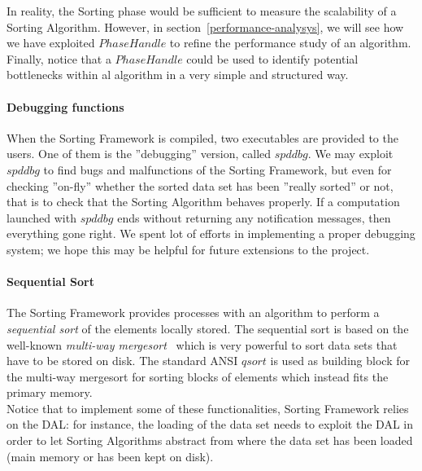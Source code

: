 In reality, the Sorting phase would be sufficient to measure the scalability of a Sorting Algorithm. However, in section~\ref{performance-analysys}, we will see how we have exploited $PhaseHandle$ to refine the performance study of an algorithm. Finally, notice that a $PhaseHandle$ could be used to identify potential bottlenecks within al algorithm in a very simple and structured way.

\paragraph{Debugging functions} When the Sorting Framework is compiled, two executables are provided to the users. One of them is the ''debugging'' version, called $spddbg$. We may exploit $spddbg$ to find bugs and malfunctions of the Sorting Framework, but even for checking ''on-fly'' whether the sorted data set has been ''really sorted'' or not, that is to check that the Sorting Algorithm behaves properly. If a computation launched with $spddbg$ ends without returning any notification messages, then everything gone right. We spent lot of efforts in implementing a proper debugging system; we hope this may be helpful for future extensions to the project. 

\paragraph{Sequential Sort} The Sorting Framework provides processes with an algorithm to perform a \textit{sequential sort} of the elements locally stored. The sequential sort is based on the well-known \textit{multi-way mergesort}~\cite{FERR} which is very powerful to sort data sets that have to be stored on disk. The standard ANSI $qsort$ is used as building block for the multi-way mergesort for sorting blocks of elements which instead fits the primary memory. \\

Notice that to implement some of these functionalities, Sorting Framework relies on the DAL: for instance, the loading of the data set needs to exploit the DAL in order to let Sorting Algorithms abstract from where the data set has been loaded (main memory or has been kept on disk).

